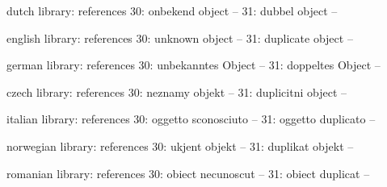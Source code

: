 

\unprotect

\startmessages  dutch  library: references
     30: onbekend object --
     31: dubbel object --
\stopmessages

\startmessages  english  library: references
     30: unknown object --
     31: duplicate object --
\stopmessages

\startmessages  german  library: references
     30: unbekanntes Object --
     31: doppeltes Object --
\stopmessages

\startmessages  czech  library: references
     30: neznamy objekt --
     31: duplicitni object --
\stopmessages

\startmessages  italian  library: references
     30: oggetto sconosciuto --
     31: oggetto duplicato --
\stopmessages

\startmessages  norwegian  library: references
     30: ukjent objekt --
     31: duplikat objekt --
\stopmessages

\startmessages  romanian  library: references
     30: obiect necunoscut --
     31: obiect duplicat --
\stopmessages



